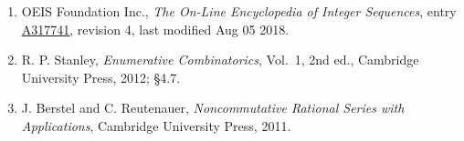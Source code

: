 \documentclass[11pt]{article}
\theoremstyle{definition}
\begin{document}
\begin{enumerate}

\item OEIS Foundation Inc., \emph{The On-Line Encyclopedia of Integer Sequences}, entry \href{https://oeis.org/A317741}{A317741}, revision 4, last modified Aug 05 2018.

\item R. P. Stanley, \emph{Enumerative Combinatorics}, Vol.~1, 2nd ed., Cambridge University Press, 2012; \S4.7.

\item J. Berstel and C. Reutenauer, \emph{Noncommutative Rational Series with Applications}, Cambridge University Press, 2011.

\end{enumerate}
\end{document}
